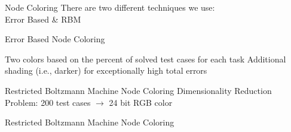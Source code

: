 \documentclass{beamer}
\begin{document}

\begin{frame}{Node Coloring}
{There are two different techniques we use:  \\ Error Based \& RBM}
\end{frame}

\begin{frame}{Error Based Node Coloring}
	\begin{overprint}
		 			\centering
	\end{overprint}
	\begin{overprint}
		\onslide<1>
		\centering
		Two colors based on the percent of solved test cases for each task
		\onslide<2>
		\centering
		Additional shading (i.e., darker) for exceptionally high total errors
	\end{overprint}
\end{frame}

\begin{frame}{Restricted Boltzmann Machine Node Coloring}
\centering
Dimensionality Reduction Problem: 200 test cases $\rightarrow$ 24 bit RGB color
\end{frame}

\begin{frame}{Restricted Boltzmann Machine Node Coloring}
\centering
\end{frame}
\end{document}
